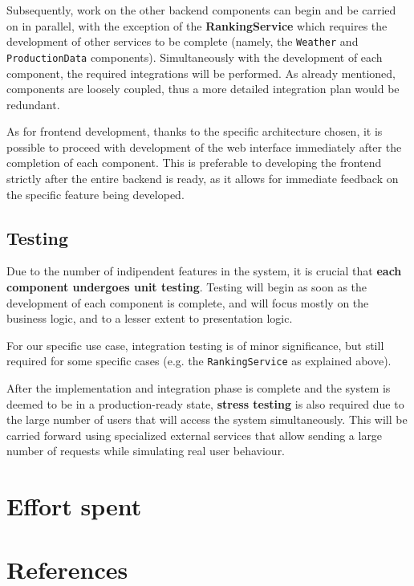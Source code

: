 \documentclass{article}
\begin{document}
\par Subsequently, work on the other backend components can begin and be carried on in parallel, with the exception of the \textbf{RankingService} which requires the development of other services to be complete (namely, the \verb|Weather| and \verb|ProductionData| components). Simultaneously with the development of each component, the required integrations will be performed. As already mentioned, components are loosely coupled, thus a more detailed integration plan would be redundant.

\par As for frontend development, thanks to the specific architecture chosen, it is possible to proceed with development of the web interface immediately after the completion of each component. This is preferable to developing the frontend strictly after the entire backend is ready, as it allows for immediate feedback on the specific feature being developed.

\subsection{Testing}
Due to the number of indipendent features in the system, it is crucial that \textbf{each component undergoes unit testing}. Testing will begin as soon as the development of each component is complete, and will focus mostly on the business logic, and to a lesser extent to presentation logic.

\par For our specific use case, integration testing is of minor significance, but still required for some specific cases (e.g. the \verb|RankingService| as explained above).

\par After the implementation and integration phase is complete and the system is deemed to be in a production-ready state, \textbf{stress testing} is also required due to the large number of users that will access the system simultaneously. This will be carried forward using specialized external services that allow sending a large number of requests while simulating real user behaviour.
\newpage
\section{Effort spent}
\newpage
\section{References}
\end{document}
